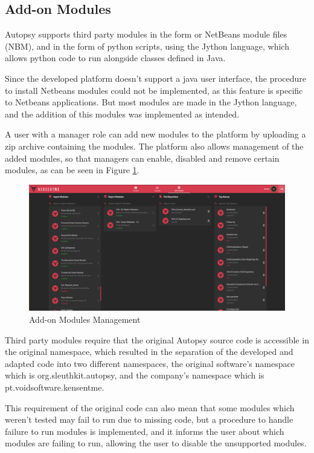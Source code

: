 \subsection{Add-on Modules}

Autopsy supports third party modules in the form or NetBeans \cite{netbeans} module files (NBM), and in the form of python scripts, using the Jython language, which allows python code to run alongside classes defined in Java.

Since the developed platform doesn't support a java user interface, the procedure to install Netbeans modules could not be implemented, as this feature is specific to Netbeans applications. 
But most modules are made in the Jython language, and the addition of this modules was implemented as intended.

A user with a manager role can add new modules to the platform by uploading a zip archive containing the modules. The platform also allows management of the added modules, so that managers can enable, disabled and remove certain modules, as can be seen in Figure \ref{fig:settings}.

\begin{figure}[ht]
 \centering
 \includegraphics[width=1\linewidth]{imgs/settings.png}
 \caption{Add-on Modules Management}
 \label{fig:settings}
\end{figure}

Third party modules require that the original Autopsy source code is accessible in the original namespace, which resulted in the separation of the
developed and adapted code into two different namespaces, the original software's namespace which is org.sleuthkit.autopsy, and the company's namespace which is pt.voidsoftware.kensentme. 

This requirement of the original code can also mean that some modules which weren't tested may fail to run due to missing code, but a procedure to handle failure to run modules is implemented, 
and it informs the user about which modules are failing to run, allowing the user to disable the unsupported modules.

